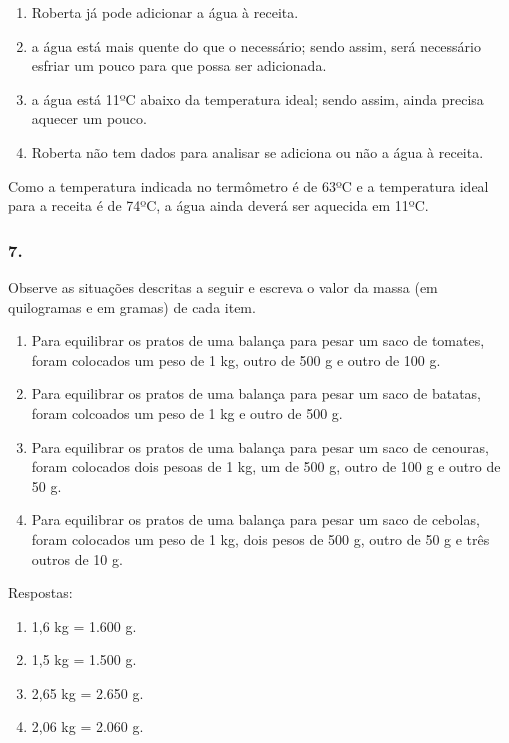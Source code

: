 \begin{enumerate}
\begin{escolha}
\begin{enumerate}
\begin{itemize}
\begin{itemize}
\begin{escolha}
\begin{enumerate}
\def\labelenumi{\alph{enumi})}
\item
  Roberta já pode adicionar a água à receita.
\item
  a água está mais quente do que o necessário; sendo assim, será
  necessário esfriar um pouco para que possa ser adicionada.
\item
  a água está 11ºC abaixo da temperatura ideal; sendo assim, ainda
  precisa aquecer um pouco.
\item
  Roberta não tem dados para analisar se adiciona ou não a água à receita.
\end{enumerate}

Como a temperatura indicada no termômetro é de 63ºC e a temperatura
ideal para a receita é de 74ºC, a água ainda deverá ser aquecida em 11ºC.

\subsubsection{7.}\label{section-45}

Observe as situações descritas a seguir e escreva o valor da massa (em quilogramas e em gramas) de cada item.

\begin{enumerate}
\def\labelenumi{\alph{enumi})}
\item
  Para equilibrar os pratos de uma balança para pesar um saco de tomates, foram colocados um peso de 1 kg, outro de 500 g e outro de 100 g.
\item
  Para equilibrar os pratos de uma balança para pesar um saco de batatas, foram colcoados um peso de 1 kg e outro de 500 g.
\item
  Para equilibrar os pratos de uma balança para pesar um saco de cenouras, foram colocados dois pesoas de 1 kg, um de 500 g, outro de 100 g e outro de 50 g.
\item
  Para equilibrar os pratos de uma balança para pesar um saco de cebolas, foram colocados um peso de 1 kg, dois pesos de 500 g, outro de 50 g e três outros de 10 g.
\end{enumerate}

Respostas:

\begin{enumerate}
\def\labelenumi{\alph{enumi})}
\item
  1,6 kg = 1.600 g.
\item
  1,5 kg = 1.500 g.
\item
  2,65 kg = 2.650 g.
\item
  2,06 kg = 2.060 g.
\end{enumerate}


\end{escolha}
\end{itemize}
\end{itemize}
\end{enumerate}
\end{escolha}
\end{enumerate}
